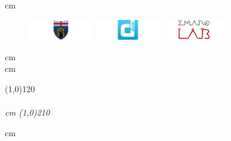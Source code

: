 \begin{frame}[plain,c]
	\begin{center}
			 cm
			\begin{figure}[htp]
				  \centering
				  \includegraphics[width=0.25\textwidth]{./figures/logo/unige.pdf}
				  \hskip 0.5cm
				  \includegraphics[width=0.25\textwidth]{./figures/logo/dibris2.pdf}
				  \hskip 0.5cm
				  \includegraphics[width=0.25\textwidth]{./figures/logo/emaroLab.pdf}
			\end{figure}
			 cm
			{\small \theInstitute \\}
			 cm
	\end{center}

			\vfill

			\line(1,0){120}\\
			\em\textsc{\textbf{\Large\theTitle \\}}
			 cm
			\line(1,0){210}  
		
 			\begin{flushright}\theAuthor\end{flushright}
			 cm 
			\vfill			
			\centering\theDate
\end{frame}
